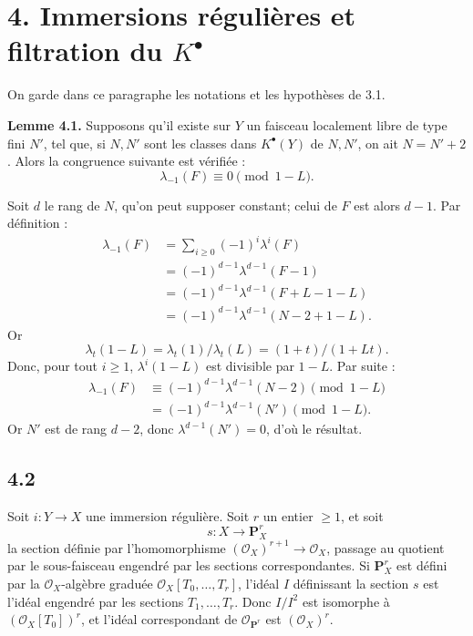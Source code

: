 \documentclass[11pt]{article}
\begin{document}
\section*{4. Immersions régulières et filtration du \(K^\bullet\)}

On garde dans ce paragraphe les notations et les hypothèses de 3.1.

\textbf{Lemme 4.1.} Supposons qu'il existe sur \(Y\) un faisceau localement libre de type fini \(N'\), tel que, si \(N,N'\) sont les classes dans \(K^\bullet(Y)\) de \(N,N'\), on ait \(N=N'+2\). Alors la congruence suivante est vérifiée :
\[
  \lambda_{-1}(F)\equiv 0 \pmod{1-L}.
\]

Soit \(d\) le rang de \(N\), qu'on peut supposer constant; celui de \(F\) est alors \(d-1\). Par définition :
\[
\begin{aligned}
\lambda_{-1}(F)
 &= \sum_{i\ge0}(-1)^i\lambda^i(F)\\
 &= (-1)^{d-1}\lambda^{d-1}(F-1)\\
 &= (-1)^{d-1}\lambda^{d-1}(F+L-1-L)\\
 &= (-1)^{d-1}\lambda^{d-1}(N-2+1-L).
\end{aligned}
\]
Or
\[
  \lambda_t(1-L)=\lambda_t(1)/\lambda_t(L)=(1+t)/(1+Lt).
\]
Donc, pour tout \(i\ge1\), \(\lambda^i(1-L)\) est divisible par \(1-L\). Par suite :
\[
\begin{aligned}
\lambda_{-1}(F)
  &\equiv (-1)^{d-1}\lambda^{d-1}(N-2) \pmod{1-L}\\
  &=(-1)^{d-1}\lambda^{d-1}(N') \pmod{1-L}.
\end{aligned}
\]
Or \(N'\) est de rang \(d-2\), donc \(\lambda^{d-1}(N')=0\), d'où le résultat.

\subsection*{4.2}

Soit \(i:Y\to X\) une immersion régulière. Soit \(r\) un entier \(\ge1\), et soit
\[
  s:X\longrightarrow \mathbf P_X^r
\]
la section définie par l'homomorphisme \((\mathcal O_X)^{r+1}\to\mathcal O_X\), passage au quotient par le sous-faisceau engendré par les sections correspondantes. Si \(\mathbf P_X^r\) est défini par la \(\mathcal O_X\)-algèbre graduée \(\mathcal O_X[T_0,\ldots,T_r]\), l'idéal \(I\) définissant la section \(s\) est l'idéal engendré par les sections \(T_1,\ldots,T_r\). Donc \(I/I^2\) est isomorphe à \((\mathcal O_X[T_0])^r\), et l'idéal correspondant de \(\mathcal O_{\mathbf P^r}\) est \((\mathcal O_X)^r\).
\end{document}
